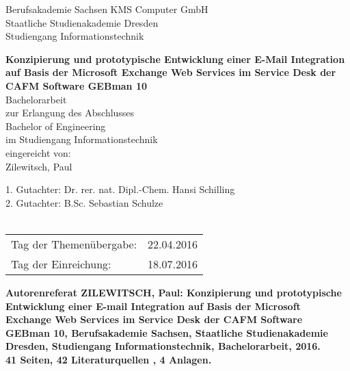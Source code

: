 \documentclass[fontsize=12pt]{scrartcl}
\begin{document}
\thispagestyle{empty}
\large
	\noindent Berufsakademie Sachsen \hfill KMS Computer GmbH\\
	Staatliche Studienakademie Dresden\\
	Studiengang Informationstechnik 
\begin{center}	
	\vspace*{4cm}
	\textbf{Konzipierung und prototypische Entwicklung einer E-Mail Integration auf Basis der Microsoft Exchange Web Services im Service Desk der CAFM Software GEBman 10}\\
	\vspace*{2cm}
		Bachelorarbeit\\ zur Erlangung des Abschlusses\\ Bachelor of Engineering\\ im Studiengang 						Informationstechnik \\
	\vspace*{2cm}
	eingereicht von:\\Zilewitsch, Paul
	\vspace*{3cm}
\end{center}
	1. Gutachter: Dr. rer. nat. Dipl.-Chem. Hansi Schilling\\
	2. Gutachter: B.Sc. Sebastian Schulze 
	\\\\
	\begin{tabular}{@{}ll}
		Tag der Themenübergabe:&22.04.2016\\
		Tag der Einreichung:&18.07.2016
	\end{tabular}
\pagebreak





\noindent
\Large\bfseries
Autorenreferat
\normalsize\mdseries
\thispagestyle{empty}
\newline\newline
\noindent
ZILEWITSCH, Paul: Konzipierung und prototypische Entwicklung einer E-mail Integration auf Basis der Microsoft Exchange Web Services im Service Desk der CAFM Software GEBman 10,  Berufsakademie Sachsen, Staatliche Studienakademie Dresden, Studiengang Informationstechnik, Bachelorarbeit, 2016.\\ 
41 Seiten, 42 Literaturquellen , 4 Anlagen. \\\\\\\\
\end{document}
